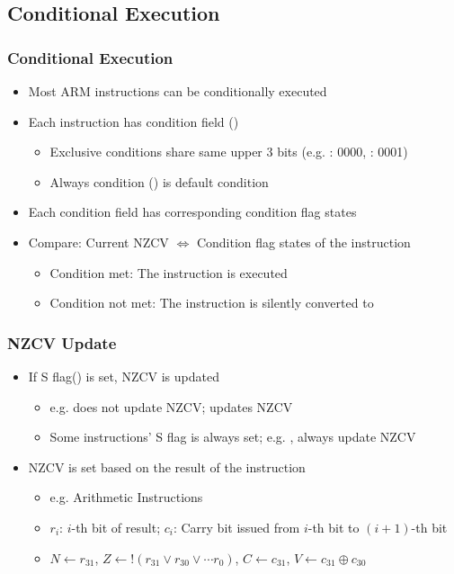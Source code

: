 \subsection{Conditional Execution}

\subsubsection*{Conditional Execution}
\begin{itemize}
    \item Most ARM instructions can be conditionally executed
    \item Each instruction has condition field ()
    \begin{itemize}
        \item Exclusive conditions share same upper 3 bits (e.g. : 0000, : 0001)
        \item Always condition () is default condition
    \end{itemize}
    \item Each condition field has corresponding condition flag states
    \item Compare: Current NZCV $\iff$ Condition flag states of the instruction
    \begin{itemize}
        \item Condition met: The instruction is executed
        \item Condition not met: The instruction is silently converted to 
    \end{itemize}
\end{itemize}

\subsubsection*{NZCV Update}
\begin{itemize}
    \item If S flag() is set, NZCV is updated
    \begin{itemize}
        \item e.g.  does not update NZCV;  updates NZCV
        \item Some instructions' S flag is always set; e.g. ,  always update NZCV
    \end{itemize}
    \item NZCV is set based on the result of the instruction
    \begin{itemize}
        \item e.g. Arithmetic Instructions
        \item $r_i$: $i$-th bit of result; $c_i$: Carry bit issued from $i$-th bit to $(i+1)$-th bit
        \item $N\leftarrow r_{31}$, $Z\leftarrow!(r_{31}\lor r_{30}\lor\cdots r_0)$, $C\leftarrow c_{31}$, $V\leftarrow c_{31}\oplus c_{30}$
    \end{itemize}
\end{itemize}

